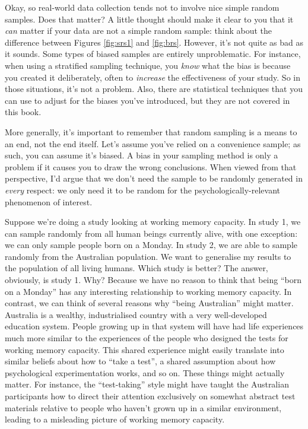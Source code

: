 \documentclass[
  11pt,
  a4paper,
  twoside,symmetric,openright]{book}
\theoremstyle{break}
\theoremstyle{break}
\begin{document}
Okay, so real-world data collection tends not to involve nice simple random samples. Does that matter? A little thought should make it clear to you that it \emph{can} matter if your data are not a simple random sample: think about the difference between Figures \ref{fig:srs1} and \ref{fig:brs}. However, it's not quite as bad as it sounds. Some types of biased samples are entirely unproblematic. For instance, when using a stratified sampling technique, you \emph{know} what the bias is because you created it deliberately, often to \emph{increase} the effectiveness of your study. So in those situations, it's not a problem. Also, there are statistical techniques that you can use to adjust for the biases you've introduced, but they are not covered in this book.

More generally, it's important to remember that random sampling is a means to an end, not the end itself. Let's assume you've relied on a convenience sample; as such, you can assume it's biased. A bias in your sampling method is only a problem if it causes you to draw the wrong conclusions. When viewed from that perspective, I'd argue that we don't need the sample to be randomly generated in \emph{every} respect: we only need it to be random for the psychologically-relevant phenomenon of interest.

Suppose we're doing a study looking at working memory capacity. In study 1, we can sample randomly from all human beings currently alive, with one exception: we can only sample people born on a Monday. In study 2, we are able to sample randomly from the Australian population. We want to generalise my results to the population of all living humans. Which study is better? The answer, obviously, is study 1. Why? Because we have no reason to think that being ``born on a Monday'' has any interesting relationship to working memory capacity. In contrast, we can think of several reasons why ``being Australian'' might matter. Australia is a wealthy, industrialised country with a very well-developed education system. People growing up in that system will have had life experiences much more similar to the experiences of the people who designed the tests for working memory capacity. This shared experience might easily translate into similar beliefs about how to ``take a test'', a shared assumption about how psychological experimentation works, and so on. These things might actually matter. For instance, the ``test-taking'' style might have taught the Australian participants how to direct their attention exclusively on somewhat abstract test materials relative to people who haven't grown up in a similar environment, leading to a misleading picture of working memory capacity.
\end{document}

